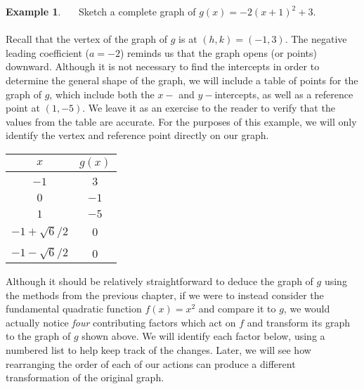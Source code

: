 \documentclass[12pt]{book}
\theoremstyle{definition}
\newtheorem{example}{Example}
\begin{document}
\begin{example}~~~Sketch a complete graph of $g(x)=-2(x+1)^2+3$.\\
~\\
Recall that the vertex of the graph of $g$ is at $(h,k)=(-1,3)$.  The negative leading coefficient ($a=-2$) reminds us that the graph opens (or points) downward.  Although it is not necessary to find the intercepts in order to determine the general shape of the graph, we will include a table of points for the graph of $g$, which include both the $x-$ and $y-$intercepts, as well as a reference point at $(1,-5)$.  We leave it as an exercise to the reader to verify that the values from the table are accurate.  For the purposes of this example, we will only identify the vertex and reference point directly on our graph.
\begin{multicols}{2}
\begin{center}
\begin{tabular}{c|c}
	$x$ & $g(x)$\\
	\hline
	&\\
	$-1$ & $3$\\
	&\\
	$0$ & $-1$\\
	&\\
	$1$ & $-5$\\
	&\\
	$-1+\sqrt{6}/2$ & $0$\\
	&\\
	$-1-\sqrt{6}/2$ & $0$
\end{tabular}
\end{center}
\columnbreak
{}
\end{multicols}
Although it should be relatively straightforward to deduce the graph of $g$ using the methods from the previous chapter, if we were to instead consider the fundamental quadratic function $f(x)=x^2$ and compare it to $g$, we would actually notice {\it four} contributing factors which act on $f$ and transform its graph to the graph of $g$ shown above.  We will identify each factor below, using a numbered list to help keep track of the changes.  Later, we will see how rearranging the order of each of our actions can produce a different transformation of the original graph. 

\end{example}
\end{document}
